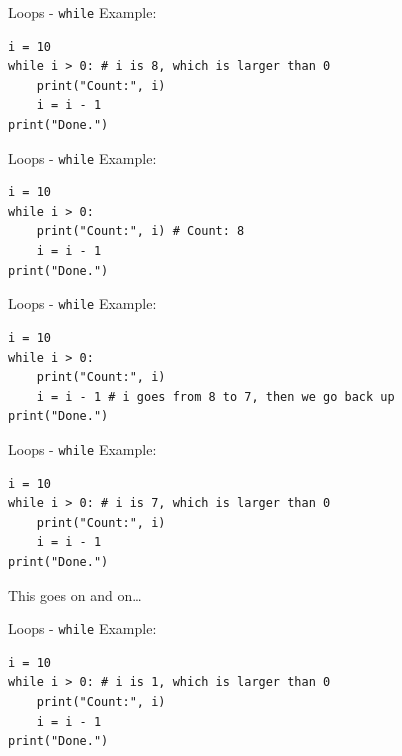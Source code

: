 \documentclass[dvipsnames, svgnames, x11names]{beamer}
\begin{document}
\addtocounter{framenumber}{-1}

\begin{frame}[fragile]{Loops - \texttt{while}}
Example:
\begin{verbatim}
i = 10
while i > 0: # i is 8, which is larger than 0
    print("Count:", i)
    i = i - 1
print("Done.")
\end{verbatim}
\end{frame}

\addtocounter{framenumber}{-1}

\begin{frame}[fragile]{Loops - \texttt{while}}
Example:
\begin{verbatim}
i = 10
while i > 0: 
    print("Count:", i) # Count: 8
    i = i - 1
print("Done.")
\end{verbatim}
\end{frame}

\addtocounter{framenumber}{-1}

\begin{frame}[fragile]{Loops - \texttt{while}}
Example:
\begin{verbatim}
i = 10
while i > 0: 
    print("Count:", i)
    i = i - 1 # i goes from 8 to 7, then we go back up
print("Done.")
\end{verbatim}
\end{frame}

\addtocounter{framenumber}{-1}

\begin{frame}[fragile]{Loops - \texttt{while}}
Example:
\begin{verbatim}
i = 10
while i > 0: # i is 7, which is larger than 0
    print("Count:", i)
    i = i - 1
print("Done.")
\end{verbatim}

This goes on and on\dots
\end{frame}

\addtocounter{framenumber}{-1}

\begin{frame}[fragile]{Loops - \texttt{while}}
Example:
\begin{verbatim}
i = 10
while i > 0: # i is 1, which is larger than 0
    print("Count:", i)
    i = i - 1
print("Done.")
\end{verbatim}
\end{frame}
\end{document}
